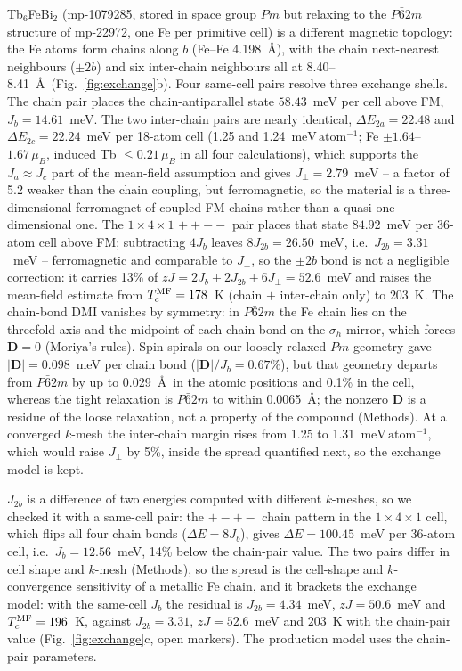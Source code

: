 \documentclass[aps,prb,preprint,superscriptaddress,longbibliography,nofootinbib]{revtex4-2}
\newcommand{\meVat}{\ensuremath{\mathrm{meV\,atom^{-1}}}}
\begin{document}
Tb$_6$FeBi$_2$ (mp-1079285, stored in space group $Pm$ but relaxing to the $P\bar{6}2m$ structure of
mp-22972, one Fe per primitive cell) is a different magnetic topology:
the Fe atoms form chains along $b$ (Fe--Fe 4.198~\AA), with the chain next-nearest neighbours ($\pm2b$) and
six inter-chain neighbours all at 8.40--8.41~\AA\ (Fig.~\ref{fig:exchange}b). Four same-cell pairs resolve
three exchange shells. The chain pair places the chain-antiparallel state $58.43$~meV per cell above FM,
$J_b=14.61$~meV. The two inter-chain pairs are nearly identical, $\Delta E_{2a}=22.48$ and
$\Delta E_{2c}=22.24$~meV per 18-atom cell (1.25 and 1.24~\meVat; Fe $\pm1.64$--$1.67\,\mu_B$, induced Tb
$\le0.21\,\mu_B$ in all four calculations), which supports the $J_a\approx J_c$ part of the mean-field
assumption and gives $J_\perp=2.79$~meV -- a factor of 5.2 weaker than the chain coupling, but ferromagnetic,
so the material is a three-dimensional ferromagnet of coupled FM chains rather than a quasi-one-dimensional
one. The $1\times4\times1$ $++--$ pair places that state $84.92$~meV per 36-atom cell above FM; subtracting
$4J_b$ leaves $8J_{2b}=26.50$~meV, i.e.\ $J_{2b}=3.31$~meV -- ferromagnetic and comparable to $J_\perp$, so
the $\pm2b$ bond is not a negligible correction: it carries 13\% of $zJ = 2J_b+2J_{2b}+6J_\perp = 52.6$~meV
and raises the mean-field estimate from $T_c^{\rm MF}=178$~K (chain $+$ inter-chain only) to $203$~K. The
chain-bond DMI vanishes by symmetry: in $P\bar{6}2m$ the Fe chain lies on the threefold axis and the midpoint
of each chain bond on the $\sigma_h$ mirror, which forces $\mathbf{D}=0$ (Moriya's rules). Spin spirals on our
loosely relaxed $Pm$ geometry gave $|\mathbf{D}|=0.098$~meV per chain bond ($|\mathbf{D}|/J_b=0.67\%$), but
that geometry departs from $P\bar{6}2m$ by up to 0.029~\AA\ in the atomic positions and 0.1\% in the cell,
whereas the tight relaxation is $P\bar{6}2m$ to within 0.0065~\AA; the nonzero $\mathbf{D}$ is a residue of
the loose relaxation, not a property of the compound (Methods). At a converged $k$-mesh the inter-chain margin
rises from 1.25 to 1.31~\meVat, which would raise $J_\perp$ by 5\%, inside the spread quantified next, so the
exchange model is kept.

$J_{2b}$ is a difference of two energies computed with different $k$-meshes, so we checked it with a
same-cell pair: the $+-+-$ chain pattern in the $1\times4\times1$ cell, which flips all four chain bonds
($\Delta E=8J_b$), gives $\Delta E=100.45$~meV per 36-atom cell, i.e.\ $J_b=12.56$~meV, 14\% below the
chain-pair value. The two pairs differ in cell shape and $k$-mesh (Methods), so the spread is the cell-shape
and $k$-convergence sensitivity of a metallic Fe chain, and it brackets the exchange model: with the
same-cell $J_b$ the residual is $J_{2b}=4.34$~meV, $zJ=50.6$~meV and $T_c^{\rm MF}=196$~K, against
$J_{2b}=3.31$, $zJ=52.6$~meV and $203$~K with the chain-pair value (Fig.~\ref{fig:exchange}c, open
markers). The production model uses the chain-pair
parameters.
\end{document}
